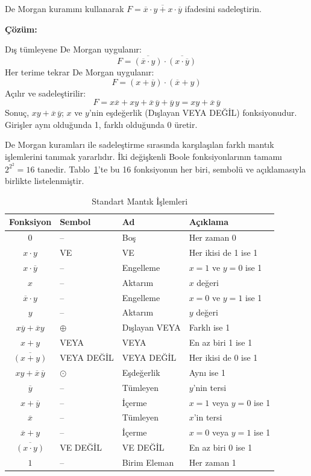 \begin{ornek}[B.2]
De Morgan kuramını kullanarak $F = \overline{\overline{x} \cdot y + x \cdot \overline{y}}$ ifadesini sadeleştirin.

\textbf{Çözüm:}

Dış tümleyene De Morgan uygulanır:
\[
F = \overline{(\overline{x} \cdot y)} \cdot \overline{(x \cdot \overline{y})}
\]
Her terime tekrar De Morgan uygulanır:
\[
F = (x + \overline{y}) \cdot (\overline{x} + y)
\]
Açılır ve sadeleştirilir:
\[
F = x\overline{x} + xy + \overline{x}\,\overline{y} + \overline{y}\,y = xy + \overline{x}\,\overline{y}
\]
Sonuç, $xy + \overline{x}\,\overline{y}$; $x$ ve $y$'nin eşdeğerlik (Dışlayan VEYA DEĞİL) fonksiyonudur. Girişler aynı olduğunda 1, farklı olduğunda 0 üretir.
\end{ornek}

De Morgan kuramları ile sadeleştirme sırasında karşılaşılan farklı mantık işlemlerini tanımak yararlıdır. İki değişkenli Boole fonksiyonlarının tamamı $2^{2^2} = 16$ tanedir. Tablo~\ref{tab:B.5}'te bu 16 fonksiyonun her biri, sembolü ve açıklamasıyla birlikte listelenmiştir.

\begin{table}[H]
\centering
\caption{Standart Mantık İşlemleri}
\label{tab:B.5}
\begin{tabular}{clll}
\toprule
\textbf{Fonksiyon} & \textbf{Sembol} & \textbf{Ad} & \textbf{Açıklama} \\
\midrule
$0$ & -- & Boş & Her zaman 0 \\
$x \cdot y$ & VE & VE & Her ikisi de 1 ise 1 \\
$x \cdot \overline{y}$ & -- & Engelleme & $x=1$ ve $y=0$ ise 1 \\
$x$ & -- & Aktarım & $x$ değeri \\
$\overline{x} \cdot y$ & -- & Engelleme & $x=0$ ve $y=1$ ise 1 \\
$y$ & -- & Aktarım & $y$ değeri \\
$x\overline{y} + \overline{x}y$ & $\oplus$ & Dışlayan VEYA & Farklı ise 1 \\
$x + y$ & VEYA & VEYA & En az biri 1 ise 1 \\
$\overline{(x + y)}$ & VEYA DEĞİL & VEYA DEĞİL & Her ikisi de 0 ise 1 \\
$x y + \overline{x}\,\overline{y}$ & $\odot$ & Eşdeğerlik & Aynı ise 1 \\
$\overline{y}$ & -- & Tümleyen & $y$'nin tersi \\
$x + \overline{y}$ & -- & İçerme & $x=1$ veya $y=0$ ise 1 \\
$\overline{x}$ & -- & Tümleyen & $x$'in tersi \\
$\overline{x} + y$ & -- & İçerme & $x=0$ veya $y=1$ ise 1 \\
$\overline{(x \cdot y)}$ & VE DEĞİL & VE DEĞİL & En az biri 0 ise 1 \\
$1$ & -- & Birim Eleman & Her zaman 1 \\
\bottomrule
\end{tabular}
\end{table}


